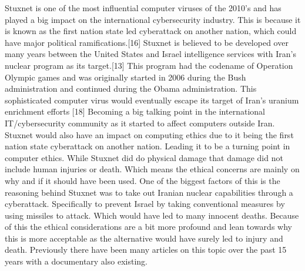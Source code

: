 Stuxnet is one of the most influential computer viruses of the 2010’s and has played a big impact on the international cybersecurity industry. This is because it is known as the first nation state led cyberattack on another nation, which could have major political ramifications.[16] Stuxnet is believed to be developed over many years between the United States and Israel intelligence services with Iran's nuclear program as its target.[13] This program had the codename of Operation Olympic games and was originally started in 2006 during the Bush administration and continued during the Obama administration. This sophisticated computer virus would eventually escape its target of Iran's uranium enrichment efforts [18] Becoming a big talking point in the international IT/cybersecurity community as it started to affect computers outside Iran. Stuxnet would also have an impact on computing ethics due to it being the first nation state cyberattack on another nation. Leading it to be a turning point in computer ethics. While Stuxnet did do physical damage that damage did not include human injuries or death. Which means the ethical concerns are mainly on why and if it should have been used. One of the biggest factors of this is the reasoning behind Stuxnet was to take out Iranian nuclear capabilities through a cyberattack. Specifically to prevent Israel by taking conventional measures by using missiles to attack. Which would have led to many innocent deaths. Because of this the ethical considerations are a bit more profound and lean towards why this is more acceptable as the alternative would have surely led to injury and death. Previously there have been many articles on this topic over the past 15 years with a documentary also existing.


